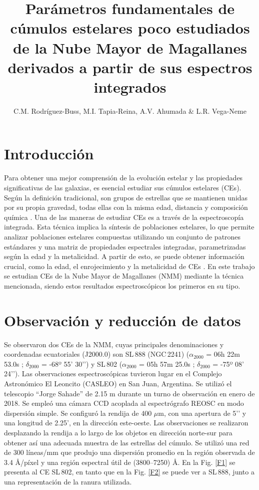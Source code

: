 \documentclass[baaa]{baaa}
\title{Parámetros fundamentales de cúmulos estelares poco estudiados de la Nube Mayor de Magallanes derivados a partir de sus espectros integrados}
\author{
C.M. Rodríguez-Buss\inst{1,2},
M.I. Tapia-Reina\inst{1,2,3},
A.V. Ahumada\inst{2,3}
\&
L.R. Vega-Neme\inst{2,4}
}
\institute{
Facultad de Matemática, Astronomía, Física y Computación, UNC, Argentina
\and   
Observatorio Astronómico de Córdoba, UNC, Argentina.
\and
Consejo Nacional de Investigaciones Científicas y Técnicas, Argentina.
\and
Instituto de Astronomía Teórica y Experimental, CONICET–UNC, Argentina.
}
\begin{document}
\maketitle

\section{Introducción}

Para obtener una mejor comprensión de la evolución estelar y las propiedades significativas de las galaxias, es esencial estudiar sus cúmulos estelares (CEs). Según la definición tradicional, son grupos de estrellas que se mantienen unidas por su propia gravedad, todas ellas con la misma edad, distancia y composición química \citep{CG2022}. Una de las maneras de estudiar CEs es a través de la espectroscopía integrada. Esta técnica implica la síntesis de poblaciones estelares, lo que permite analizar poblaciones estelares compuestas utilizando un conjunto de patrones estándares y una matriz de propiedades espectrales integradas, parametrizadas según la edad y la metalicidad. A partir de esto, se puede obtener información crucial, como la edad, el enrojecimiento y la metalicidad de CEs \citep{AVA2019}. En este trabajo se estudian CEs de la Nube Mayor de Magallanes (NMM) mediante la técnica mencionada, siendo estos resultados espectroscópicos los primeros en su tipo.


\section{Observación y reducción de datos}

Se observaron dos CEs de la NMM, cuyas principales denominaciones y coordenadas ecuatoriales (J2000.0) son SL\,888 (NGC\,2241) ($\alpha_{2000}$ = 06h 22m 53.0s ; $\delta_{2000}$ = -68º 55’ 30’’) y SL\,802 ($\alpha_{2000}$ = 05h 57m 25.0s ; $\delta_{2000}$ = -75º 08’ 24’’). Las observaciones espectroscópicas tuvieron lugar en el Complejo Astronómico El Leoncito (CASLEO) en San Juan, Argentina. Se utilizó el telescopio ``Jorge Sahade'' de 2.15 m durante un turno de observación en enero de 2018. Se empleó una cámara CCD acoplada al espectrógrafo REOSC en modo dispersión simple. Se configuró la rendija de 400 $\mu$m, con una apertura de 5’’ y una longitud de 2.25', en la dirección este-oeste. Las observaciones se realizaron desplazando la rendija a lo largo de los objetos en dirección norte-sur para obtener así una adecuada muestra de las estrellas del cúmulo. Se utilizó una red de 300 líneas/mm que produjo una dispersión promedio en la región observada de 3.4 \r{A}/píxel y una región espectral útil de (3800–7250) \r{A}. En la Fig. \ref{F1} se presenta al CE SL\,802, en tanto que en la Fig. \ref{F2} se puede ver a SL\,888, junto a una representación de la ranura utilizada.
\end{document}
